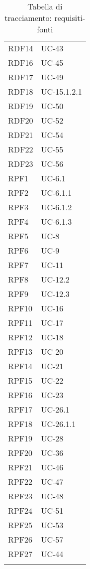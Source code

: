 \begin{longtable}{| p{5cm} | p{5cm} |}
		\rowcolor{LightGray}
		RDF14 & UC-43\\
		RDF16 & UC-45\\
		\rowcolor{LightGray}
		RDF17 & UC-49 \\
		RDF18 & UC-15.1.2.1 \\
		\rowcolor{LightGray}
		RDF19 & UC-50 \\
		RDF20 & UC-52 \\
		\rowcolor{LightGray}
		RDF21 & UC-54 \\
		RDF22 & UC-55 \\
		\rowcolor{LightGray}
		RDF23 & UC-56 \\
		RPF1 & UC-6.1\\
		\rowcolor{LightGray}
		RPF2 & UC-6.1.1\\
		RPF3 & UC-6.1.2\\
		\rowcolor{LightGray}
		RPF4 & UC-6.1.3\\
		RPF5 & UC-8\\
		\rowcolor{LightGray}
		RPF6 & UC-9\\
		RPF7 & UC-11\\
		\rowcolor{LightGray}
		RPF8 & UC-12.2\\
		RPF9 & UC-12.3\\
		\rowcolor{LightGray}
		RPF10 & UC-16\\
		RPF11 & UC-17\\
		\rowcolor{LightGray}
		RPF12 & UC-18\\
		RPF13 & UC-20\\
		\rowcolor{LightGray}
		RPF14 & UC-21\\
		RPF15 & UC-22\\
		\rowcolor{LightGray}
		RPF16 & UC-23\\
		RPF17 & UC-26.1\\
		\rowcolor{LightGray}
		RPF18 & UC-26.1.1\\
		RPF19 & UC-28\\
		\rowcolor{LightGray}
		RPF20 & UC-36\\
		RPF21 & UC-46\\
		\rowcolor{LightGray}
		RPF22 & UC-47\\
		RPF23 & UC-48\\
		\rowcolor{LightGray}
		RPF24 & UC-51\\
		RPF25 & UC-53\\
		\rowcolor{LightGray}
		RPF26 & UC-57\\	
		RPF27 & UC-44\\
		\rowcolor{LightGray}
		\hline
		\caption{Tabella di tracciamento: requisiti-fonti}
\end{longtable}

